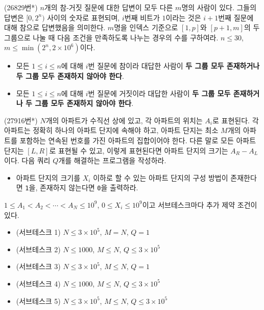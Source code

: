 \begin{problem}
    (26829번*) $n$개의 참-거짓 질문에 대한 답변이 모두 다른 $m$명의 사람이 있다. 그들의 답변은 $[0, 2^n)$ 사이의 숫자로 표현되며, $i$번째 비트가 $1$이라는 것은 $i+1$번째 질문에 대해 참으로 답변했음을 의미한다. $m$명을 인덱스 기준으로 $[1, p]$와 $[p+1, m]$의 두 그룹으로 나눌 때 다음 조건을 만족하도록 나누는 경우의 수를 구하여라. $n \leq 30$, $m \leq \min(2^n, 2 \times 10^6)$이다.
    \begin{itemize}
        \item 모든 $1 \leq i \leq n$에 대해 $i$번 질문에 참이라 대답한 사람이 \textbf{두 그룹 모두 존재하거나 두 그룹 모두 존재하지 않아야 한다}.
        \item 모든 $1 \leq i \leq n$에 대해 $i$번 질문에 거짓이라 대답한 사람이 \textbf{두 그룹 모두 존재하거나 두 그룹 모두 존재하지 않아야 한다}.
    \end{itemize}
\end{problem}

\begin{problem}
    (27916번*) $N$개의 아파트가 수직선 상에 있고, 각 아파트의 위치는 $A_i$로 표현된다. 각 아파트는 정확히 하나의 아파트 단지에 속해야 하고, 아파트 단지는 최소 $M$개의 아파트를 포함하는 연속된 번호를 가진 아파트의 집합이어야 한다. 다른 말로 모든 아파트 단지는 $[L, R]$로 표현될 수 있고, 이렇게 표현된다면 아파트 단지의 크기는 $A_R - A_L$이다. 다음 쿼리 $Q$개를 해결하는 프로그램을 작성하라.
    \begin{itemize}
        \item 아파트 단지의 크기를 $X_i$ 이하로 할 수 있는 아파트 단지의 구성 방법이 존재한다면 \texttt{1}을, 존재하지 않는다면 \texttt{0}을 출력하라.
    \end{itemize}
    $1 \leq A_1 < A_2 < \cdots < A_N \leq 10^9$, $0 \leq X_i \leq 10^9$이고 서브테스크마다 추가 제약 조건이 있다.
    \begin{itemize}
        \item (서브테스크 1) $N \leq 3 \times 10^5$, $M = N$, $Q = 1$
        \item (서브테스크 2) $N \leq 1000$, $M \leq N$, $Q \leq 3 \times 10^5$
        \item (서브테스크 3) $N \leq 3 \times 10^5$, $M \leq N$, $Q = 1$
        \item (서브테스크 4) $N \leq 1000$, $M \leq N$, $Q \leq 3 \times 10^5$
        \item (서브테스크 5) $N \leq 3 \times 10^5$, $M \leq N$, $Q \leq 3 \times 10^5$
    \end{itemize}
\end{problem}

